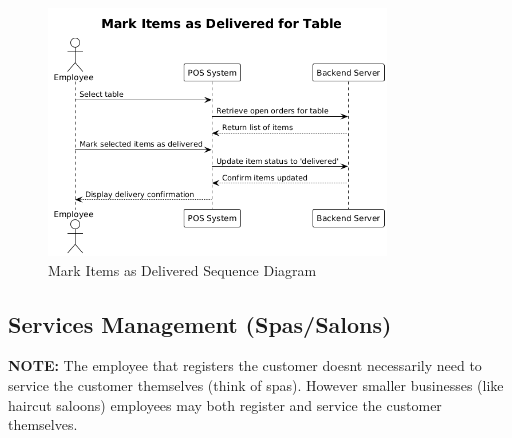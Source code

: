\documentclass[]{VUMIFTemplateClass}
\newcommand{\noticecomment}[1]{%
    \begin{tcolorbox}[colback=blue!20, colframe=blue!60, arc=0pt, outer arc=0pt, boxrule=1pt, left=3pt, right=3pt, top=3pt, bottom=3pt]
        \textbf{\textcolor{blue!70!black}{NOTE:}} #1
    \end{tcolorbox}
}
\begin{document}
\begin{figure}[H]
    \centering
    \includegraphics[width=0.8\textwidth]{images/diagrams/orders/order_mark_items_delivered_sequence.png}
    \caption{Mark Items as Delivered Sequence Diagram}
    \label{fig:mark_items_delivered_sequence}
\end{figure}


\subsection{Services Management (Spas/Salons)}

%

\noticecomment{The employee that registers the customer doesnt necessarily need to service the customer themselves (think of spas). However smaller businesses (like haircut saloons) employees may both register and service the customer themselves.}
\end{document}
